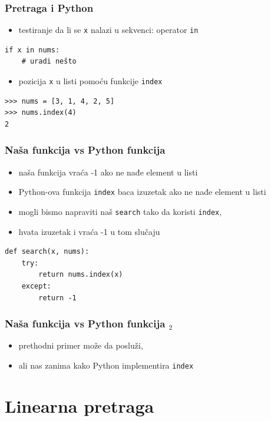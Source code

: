 \documentclass[utf8,compress,aspectratio=169]{beamer}
\begin{document}
\begin{frame}[fragile]
  \frametitle{Pretraga i Python}
  \begin{itemize}
    \item testiranje da li se \texttt{x} nalazi u sekvenci: operator \texttt{in}
  \end{itemize}
\begin{verbatim}
if x in nums:
    # uradi nešto
\end{verbatim}
  \begin{itemize}
    \item pozicija \texttt{x} u listi pomoću funkcije \texttt{index}
  \end{itemize}
\begin{verbatim}
>>> nums = [3, 1, 4, 2, 5]
>>> nums.index(4)
2
\end{verbatim}
\end{frame}

\begin{frame}[fragile]
  \frametitle{Naša funkcija vs Python funkcija}
  \begin{itemize}
    \item naša funkcija vraća -1 ako ne nađe element u listi
    \item Python-ova funkcija \texttt{index} baca izuzetak ako ne nađe element u listi
    \item mogli bismo napraviti naš \texttt{search} tako da koristi \texttt{index},
    \item hvata izuzetak i vraća -1 u tom slučaju
  \end{itemize}
\begin{verbatim}
def search(x, nums):
    try:
        return nums.index(x)
    except:
        return -1
\end{verbatim}
\end{frame}

\begin{frame}[fragile]
  \frametitle{Naša funkcija vs Python funkcija $_2$}
  \begin{itemize}
    \item prethodni primer može da posluži,
    \item ali nas zanima kako Python implementira \texttt{index}
  \end{itemize}
\end{frame}

\section[Linearna]{Linearna pretraga}
\end{document}
